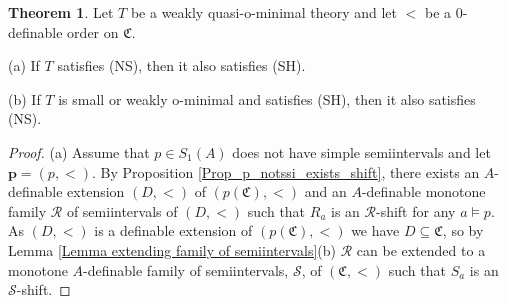 \documentclass{amsart}
\theoremstyle{definition}
\newtheorem{Theorem}{Theorem}[section]
\theoremstyle{definition}
\newcommand{\Mon}{\mathfrak C}
\begin{document}
\begin{Theorem}\label{Thm_noshifts_iff_simplesemiintervals}
Let $T$ be a weakly quasi-o-minimal theory and let $<$ be a $0$-definable order on $\Mon$. 

(a) If $T$ satisfies (NS), then it also satisfies (SH).

(b) If $T$ is small or weakly o-minimal and satisfies (SH), then it also satisfies (NS).
\end{Theorem}
\begin{proof} 
(a) Assume that $p\in S_1(A)$ does not have simple semiintervals and let $\mathbf p=(p,<)$. By Proposition \ref{Prop_p_notssi_exists_shift}, there exists an $A$-definable extension $(D,<)$ of $(p(\Mon),<)$ and an $A$-definable monotone family $\mathcal R$ of semiintervals of $(D,<)$ such that $R_a$ is an  $\mathcal R$-shift for any $a\models p$. As $(D,<)$ is a definable extension of $(p(\Mon),<)$ we have $D\subseteq \Mon$, so by Lemma \ref{Lemma extending family of semiintervals}(b) $\mathcal R$ can be extended to a monotone $A$-definable family of semiintervals, $\mathcal S$, of $(\Mon,<)$ such that $S_a$ is an $\mathcal S$-shift.  



\end{proof}
\end{document}
